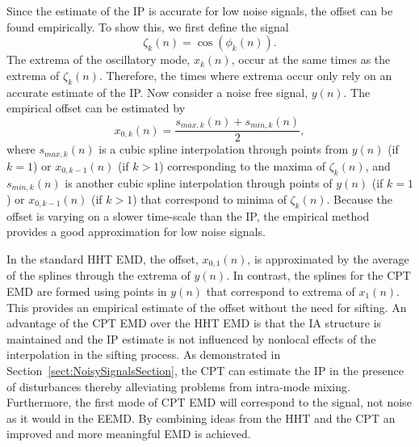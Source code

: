 \documentclass[11pt,draftcls,onecolumn]{IEEEtran}
\begin{document}
Since the estimate of the IP is accurate for low noise signals, the offset can be found empirically. To show this, we first define the signal
\begin{equation}
	\zeta_k(n)=\cos(\phi_k(n)).
\end{equation}   
The extrema of the oscillatory mode, $x_k(n)$, occur at the same times as the extrema of $\zeta_k(n)$. Therefore, the times where extrema occur only rely on an accurate estimate of the IP. Now consider a noise free signal, $y(n)$. The empirical offset can be estimated by 
\begin{equation}
    x_{0,k}(n) = \frac{s_{max,k}(n) + s_{min,k}(n)}{2},
\end{equation}
where $s_{max,k}(n)$ is a cubic spline interpolation through points from $y(n)$ (if $k=1$) or $x_{0,k-1}(n)$ (if $k>1$) corresponding to the maxima of $\zeta_k(n)$, and $s_{min,k}(n)$ is another cubic spline interpolation through points of $y(n)$ (if $k=1$) or $x_{0,k-1}(n)$ (if $k>1$) that correspond to minima of $\zeta_k(n)$. Because the offset is varying on a slower time-scale than the IP, the empirical method provides a good approximation for low noise signals. 

In the standard HHT EMD, the offset, $x_{0,1}(n)$, is approximated by the average of the splines through the extrema of $y(n)$. In contrast, the splines for the CPT EMD are formed using points in $y(n)$ that correspond to extrema of $x_1(n)$. This provides an empirical estimate of the offset without the need for sifting. An advantage of the CPT EMD over the HHT EMD is that the IA structure is maintained and the IP estimate is not influenced by nonlocal effects of the interpolation in the sifting process. As demonstrated in Section~\ref{sect:NoisySignalsSection}, the CPT can estimate the IP in the presence of disturbances thereby alleviating problems from intra-mode mixing. Furthermore, the first mode of CPT EMD will correspond to the signal, not noise as it would in the EEMD. By combining ideas from the HHT and the CPT an improved and more meaningful EMD is achieved. %
% 




\end{document}
